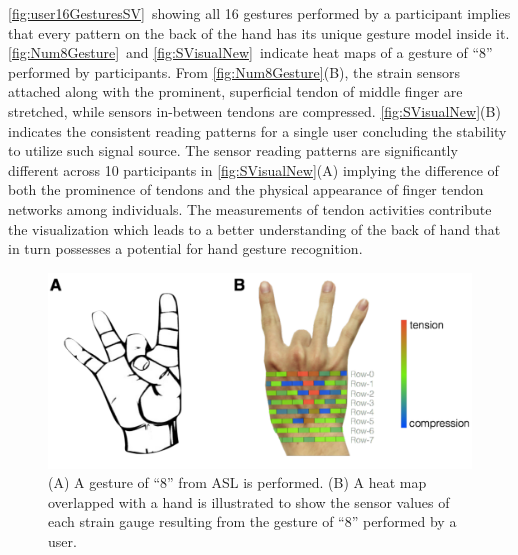 \documentclass{sigchi}
\begin{document}
\autoref{fig:user16GesturesSV}\ showing all 16 gestures performed by a participant implies that every pattern on the back of the hand has its unique gesture model inside it.
\autoref{fig:Num8Gesture}\ and \autoref{fig:SVisualNew}\ indicate heat maps of a gesture of ``8'' performed by participants.
From \autoref{fig:Num8Gesture}(B), the strain sensors attached along with the prominent, superficial tendon of middle finger are stretched, while sensors in-between tendons are compressed.
\autoref{fig:SVisualNew}(B) indicates the consistent reading patterns for a single user concluding the stability to utilize such signal source.
The sensor reading patterns are significantly different across 10 participants in \autoref{fig:SVisualNew}(A) implying the difference of both the prominence of tendons and the physical appearance of finger tendon networks among individuals.
The measurements of tendon activities contribute the visualization which leads to a better understanding of the back of hand that in turn possesses a potential for hand gesture recognition.

\begin{figure}[t]
 \begin{center}
  \includegraphics[width=0.9\columnwidth]{figures/Num8GestureV4.pdf}
  \caption{
    (A) A gesture of ``8'' from ASL is performed.
    (B) A heat map overlapped with a hand is illustrated to show the sensor values of each strain gauge resulting from the gesture of ``8'' performed by a user.
  }
  \label{fig:Num8Gesture}
  \end{center}
\end{figure}
\end{document}

